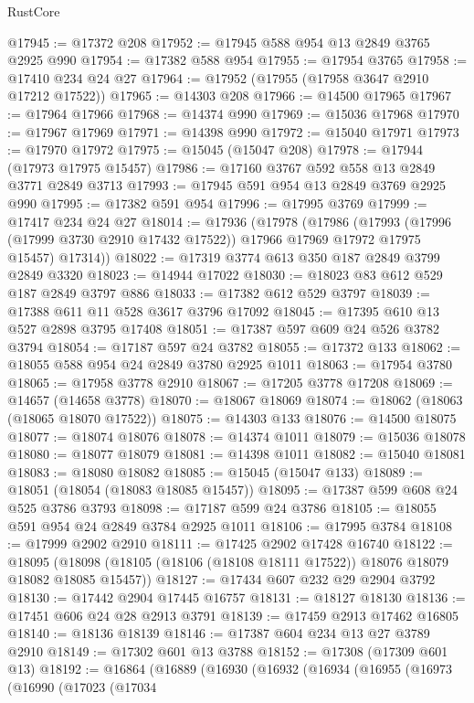 \begin{lexlean}{RustCore}
\begin{coremodule}
@17945 := @17372 @208
@17952 := @17945 @588 @954 @13 @2849 @3765 @2925 @990
@17954 := @17382 @588 @954
@17955 := @17954 @3765
@17958 := @17410 @234 @24 @27
@17964 := @17952 (@17955 (@17958 @3647 @2910 @17212 @17522))
@17965 := @14303 @208
@17966 := @14500 @17965
@17967 := @17964 @17966
@17968 := @14374 @990
@17969 := @15036 @17968
@17970 := @17967 @17969
@17971 := @14398 @990
@17972 := @15040 @17971
@17973 := @17970 @17972
@17975 := @15045 (@15047 @208)
@17978 := @17944 (@17973 @17975 @15457)
@17986 := @17160 @3767 @592 @558 @13 @2849 @3771 @2849 @3713
@17993 := @17945 @591 @954 @13 @2849 @3769 @2925 @990
@17995 := @17382 @591 @954
@17996 := @17995 @3769
@17999 := @17417 @234 @24 @27
@18014 := @17936
    (@17978
      (@17986
        (@17993 (@17996 (@17999 @3730 @2910 @17432 @17522)) @17966 @17969 @17972 @17975 @15457)
        @17314))
@18022 := @17319 @3774 @613 @350 @187 @2849 @3799 @2849 @3320
@18023 := @14944 @17022
@18030 := @18023 @83 @612 @529 @187 @2849 @3797 @886
@18033 := @17382 @612 @529 @3797
@18039 := @17388 @611 @11 @528 @3617 @3796 @17092
@18045 := @17395 @610 @13 @527 @2898 @3795 @17408
@18051 := @17387 @597 @609 @24 @526 @3782 @3794
@18054 := @17187 @597 @24 @3782
@18055 := @17372 @133
@18062 := @18055 @588 @954 @24 @2849 @3780 @2925 @1011
@18063 := @17954 @3780
@18065 := @17958 @3778 @2910
@18067 := @17205 @3778 @17208
@18069 := @14657 (@14658 @3778)
@18070 := @18067 @18069
@18074 := @18062 (@18063 (@18065 @18070 @17522))
@18075 := @14303 @133
@18076 := @14500 @18075
@18077 := @18074 @18076
@18078 := @14374 @1011
@18079 := @15036 @18078
@18080 := @18077 @18079
@18081 := @14398 @1011
@18082 := @15040 @18081
@18083 := @18080 @18082
@18085 := @15045 (@15047 @133)
@18089 := @18051 (@18054 (@18083 @18085 @15457))
@18095 := @17387 @599 @608 @24 @525 @3786 @3793
@18098 := @17187 @599 @24 @3786
@18105 := @18055 @591 @954 @24 @2849 @3784 @2925 @1011
@18106 := @17995 @3784
@18108 := @17999 @2902 @2910
@18111 := @17425 @2902 @17428 @16740
@18122 := @18095
    (@18098 (@18105 (@18106 (@18108 @18111 @17522)) @18076 @18079 @18082 @18085 @15457))
@18127 := @17434 @607 @232 @29 @2904 @3792
@18130 := @17442 @2904 @17445 @16757
@18131 := @18127 @18130
@18136 := @17451 @606 @24 @28 @2913 @3791
@18139 := @17459 @2913 @17462 @16805
@18140 := @18136 @18139
@18146 := @17387 @604 @234 @13 @27 @3789 @2910
@18149 := @17302 @601 @13 @3788
@18152 := @17308 (@17309 @601 @13)
@18192 := @16864
    (@16889
      (@16930
        (@16932
          (@16934
            (@16955
              (@16973
                (@16990
                  (@17023
                    (@17034

\end{coremodule}
\end{lexlean}
